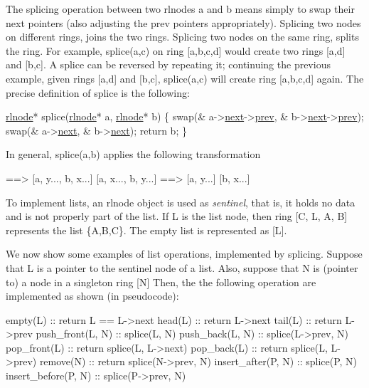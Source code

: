 The splicing operation between two rlnodes a and b means simply to swap their {\ttfamily next} pointers (also adjusting the \textquotesingle{}prev\textquotesingle{} pointers appropriately). Splicing two nodes on different rings, joins the two rings. Splicing two nodes on the same ring, splits the ring. For example, {\ttfamily splice(a,c)} on ring \mbox{[}a,b,c,d\mbox{]} would create two rings \mbox{[}a,d\mbox{]} and \mbox{[}b,c\mbox{]}. A splice can be reversed by repeating it; continuing the previous example, given rings \mbox{[}a,d\mbox{]} and \mbox{[}b,c\mbox{]}, splice(a,c) will create ring \mbox{[}a,b,c,d\mbox{]} again. The precise definition of splice is the following\+: 
\begin{DoxyCode}
\hyperlink{structresource__list__node}{rlnode}* splice(\hyperlink{structresource__list__node}{rlnode}* a, \hyperlink{structresource__list__node}{rlnode}* b) \{
    swap(& a->\hyperlink{structresource__list__node_a04b1ee9524cd800f14de2925141e3762}{next}->\hyperlink{structresource__list__node_a280b77fdcee186bcaade02f76322d183}{prev}, & b->\hyperlink{structresource__list__node_a04b1ee9524cd800f14de2925141e3762}{next}->\hyperlink{structresource__list__node_a280b77fdcee186bcaade02f76322d183}{prev});
    swap(& a->\hyperlink{structresource__list__node_a04b1ee9524cd800f14de2925141e3762}{next}, & b->\hyperlink{structresource__list__node_a04b1ee9524cd800f14de2925141e3762}{next});
    \textcolor{keywordflow}{return} b;
\}
\end{DoxyCode}
 In general, {\ttfamily splice(a,b)} applies the following transformation \begin{DoxyVerb}[a, x...]  [b, y...]   ==>   [a, y..., b, x...]
[a, x..., b, y...]     ==>   [a, y...]  [b, x...]
\end{DoxyVerb}


To implement lists, an rlnode object is used as {\itshape sentinel}, that is, it holds no data and is not properly part of the list. If L is the list node, then ring \mbox{[}C, L, A, B\mbox{]} represents the list \{A,B,C\}. The empty list is represented as \mbox{[}L\mbox{]}.

We now show some examples of list operations, implemented by splicing. Suppose that L is a pointer to the sentinel node of a list. Also, suppose that N is (pointer to) a node in a singleton ring \mbox{[}N\mbox{]} Then, the the following operation are implemented as shown (in pseudocode)\+: \begin{DoxyVerb}empty(L)              ::  return  L == L->next
head(L)               ::  return  L->next
tail(L)               ::  return  L->prev
push_front(L, N)      ::  splice(L, N)
push_back(L, N)       ::  splice(L->prev, N)
pop_front(L)          ::  return splice(L, L->next)
pop_back(L)           ::  return splice(L, L->prev) 
remove(N)             ::  return splice(N->prev, N)
insert_after(P, N)    ::  splice(P, N)
insert_before(P, N)   ::  splice(P->prev, N)
\end{DoxyVerb}


